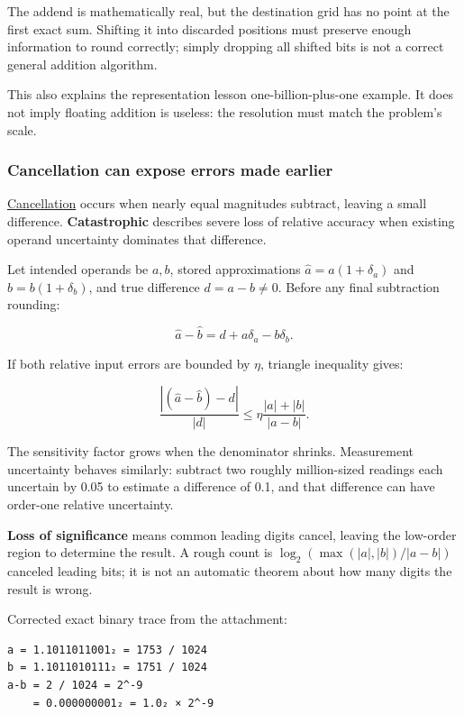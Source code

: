 The addend is mathematically real, but the destination grid has no point at the first exact sum. Shifting it into discarded positions must preserve enough information to round correctly; simply dropping all shifted bits is not a correct general addition algorithm.

This also explains the representation lesson one-billion-plus-one example. It does not imply floating addition is useless: the resolution must match the problem's scale.

\subsubsection{Cancellation can expose errors made earlier}\label{01-foundations-i-ch001-cancellation-can-expose-errors-made-earlier}

\hypertarget{01-foundations-i-ch001-cancellation-can-expose-errors-made-earlier}{}

\hyperref[appendix-a2773a6a2f9d]{Cancellation} occurs when nearly equal magnitudes subtract, leaving a small difference. \textbf{Catastrophic} describes severe loss of relative accuracy when existing operand uncertainty dominates that difference.

Let intended operands be \(a,b\), stored approximations \(\widehat a=a(1+\delta_a)\) and \(\widehat b=b(1+\delta_b)\), and true difference \(d=a-b\ne0\). Before any final subtraction rounding:

\[
\widehat a-\widehat b=d+a\delta_a-b\delta_b.
\]

If both relative input errors are bounded by \(\eta\), triangle inequality gives:

\[
\frac{|(\widehat a-\widehat b)-d|}{|d|}
\le\eta\frac{|a|+|b|}{|a-b|}.
\]

The sensitivity factor grows when the denominator shrinks. Measurement uncertainty behaves similarly: subtract two roughly million-sized readings each uncertain by 0.05 to estimate a difference of 0.1, and that difference can have order-one relative uncertainty.

\textbf{Loss of significance} means common leading digits cancel, leaving the low-order region to determine the result. A rough count is \(\log_2(\max(|a|,|b|)/|a-b|)\) canceled leading bits; it is not an automatic theorem about how many digits the result is wrong.

Corrected exact binary trace from the attachment:

\begin{verbatim}
a = 1.1011011001₂ = 1753 / 1024
b = 1.1011010111₂ = 1751 / 1024
a-b = 2 / 1024 = 2^-9
    = 0.000000001₂ = 1.0₂ × 2^-9
\end{verbatim}

